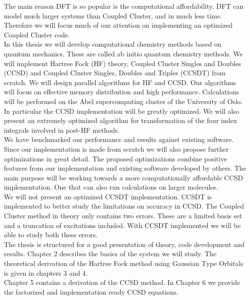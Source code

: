 \documentclass[a4paper,norsk,11pt,twoside]{report}
\begin{document}
The main reason DFT is so popular is the computational
affordability. DFT can model much larger systems than Coupled Cluster,
and in much less time. Therefore we will focus much of our attention
on implementing an optimized Coupled Cluster code. \\

In this thesis we will develop computational chemistry methods based
on quantum mechanics. These are called ab initio quantum chemistry
methods. We will implement Hartree Fock (HF) theory, Coupled Cluster Singles
and Doubles (CCSD) and Coupled Cluster Singles, Doubles and Triples
(CCSDT) from scratch. We will design parallel algorithms for HF and
CCSD. Our algorithms will focus on effective memory distribution and
high performance. Calculations will be performed on the Abel supercomputing
cluster of the University of Oslo. In particular the CCSD implementation will be greatly
optimized. We will also present an extremely optimized algorithm for
transformation of the four index integrals involved in post-HF
methods. \\

We have benchmarked our performance and results against existing
software. Since our implementation is made from scratch we will also
propose further optimizations in great detail. The proposed
optimizations combine positive features from our implementation and
existing software developed by others. The main purpose will be
working towards a more computationally affordable CCSD
implementation. One that can also run calculations on larger
molecules. \\

We will not present an optimized CCSDT implementation. CCSDT is
implemented to better study the limitations on accuracy in
CCSD. The Coupled Cluster method in theory only contains two errors. These are a
limited basis set and a truncation of excitations included. With CCSDT
implemented we will be able to study both these errors. \\

The thesis is structured for a good presentation of theory, code
development and results. Chapter 2 describes the basics of the system
we will study. The theoretical derivation of the Hartree Fock method
using Gaussian Type Orbitals is given in chapters 3 and 4. \\

Chapter 5 contains a derivation of the CCSD method. In Chapter 6 we provide
the factorized and implementation ready CCSD equations. \\
\end{document}
